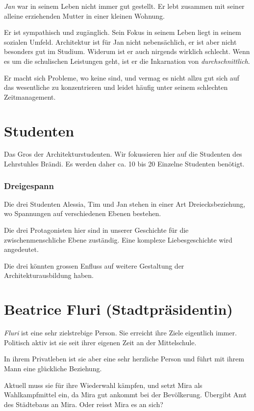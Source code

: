 \documentclass[11pt,a4paper,ngerman]{scrreprt}
\begin{document}
\emph{Jan} war in seinem Leben nicht immer gut gestellt. Er lebt zusammen mit seiner
alleine erziehenden Mutter in einer kleinen Wohnung.

Er ist sympathisch und zugänglich. Sein Fokus in seinem Leben liegt in seinem
sozialen Umfeld. Architektur ist für Jan nicht nebensächlich, er ist aber nicht
besonders gut im Studium. Widerum ist er auch nirgends wirklich schlecht. Wenn
es um die schulischen Leistungen geht, ist er die Inkarnation von
\emph{durchschnittlich}.

Er macht sich Probleme, wo keine sind, und vermag es nicht allzu gut sich auf
das wesentliche zu konzentrieren und leidet häufig unter seinem schlechten
Zeitmanagement.

\section*{Studenten}

Das Gros der Architekturstudenten. Wir fokussieren hier auf die Studenten des
Lehrstuhles Brändi. Es werden daher ca. 10 bis 20 Einzelne Studenten benötigt.

\subsubsection*{Dreigespann}

Die drei Studenten Alessia, Tim und Jan stehen in einer Art Dreiecksbeziehung,
wo Spannungen auf verschiedenen Ebenen bestehen.

Die drei Protagonisten hier sind in unserer Geschichte für die
zwischenmenschliche Ebene zuständig. Eine komplexe Liebesgeschichte wird
angedeutet.

Die drei könnten grossen Enfluss auf weitere Gestaltung der
Architekturausbildung haben.

\section*{Beatrice Fluri (Stadtpräsidentin)}

\emph{Fluri} ist eine sehr zielstrebige Person. Sie erreicht ihre Ziele eigentlich
immer. Politisch aktiv ist sie seit ihrer eigenen Zeit an der Mittelschule.

In ihrem Privatleben ist sie aber eine sehr herzliche Person und führt mit ihrem
Mann eine glückliche Beziehung.

Aktuell muss sie für ihre Wiederwahl kämpfen, und setzt Mira als Wahlkampfmittel
ein, da Mira gut ankommt bei der Bevölkerung.  Übergibt Amt des Städtebaus an
Mira. Oder reisst Mira es an sich?
\end{document}
